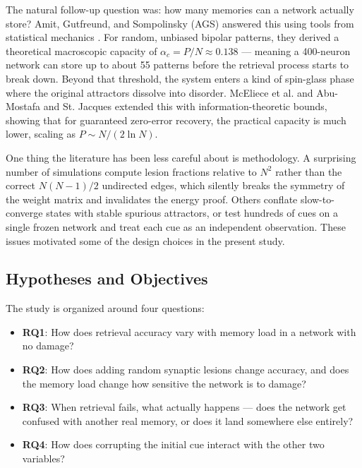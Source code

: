 \documentclass[11pt,a4paper]{article}
\begin{document}
The natural follow-up question was: how many memories can a network actually store? Amit, Gutfreund, and Sompolinsky (AGS) answered this using tools from statistical mechanics \cite{amit1985,amit1987}. For random, unbiased bipolar patterns, they derived a theoretical macroscopic capacity of $\alpha_c = P/N \approx 0.138$ --- meaning a 400-neuron network can store up to about 55 patterns before the retrieval process starts to break down. Beyond that threshold, the system enters a kind of spin-glass phase where the original attractors dissolve into disorder. McEliece et al. \cite{mceliece1987} and Abu-Mostafa and St. Jacques \cite{abumostafa1985} extended this with information-theoretic bounds, showing that for guaranteed zero-error recovery, the practical capacity is much lower, scaling as $P \sim N / (2 \ln N)$.

One thing the literature has been less careful about is methodology. A surprising number of simulations compute lesion fractions relative to $N^2$ rather than the correct $N(N-1)/2$ undirected edges, which silently breaks the symmetry of the weight matrix and invalidates the energy proof. Others conflate slow-to-converge states with stable spurious attractors, or test hundreds of cues on a single frozen network and treat each cue as an independent observation. These issues motivated some of the design choices in the present study.

\subsection{Hypotheses and Objectives}

The study is organized around four questions:

\begin{itemize}
    \item \textbf{RQ1}: How does retrieval accuracy vary with memory load in a network with no damage?
    \item \textbf{RQ2}: How does adding random synaptic lesions change accuracy, and does the memory load change how sensitive the network is to damage?
    \item \textbf{RQ3}: When retrieval fails, what actually happens --- does the network get confused with another real memory, or does it land somewhere else entirely?
    \item \textbf{RQ4}: How does corrupting the initial cue interact with the other two variables?
\end{itemize}
\end{document}
